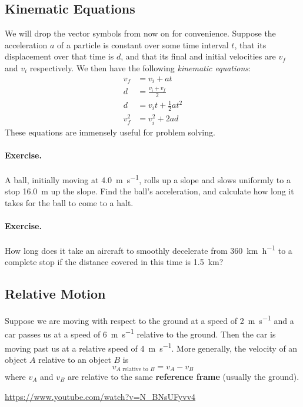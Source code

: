 \documentclass[a4paper]{amsbook}
\begin{document}
\subsection{Kinematic Equations}
We will drop the vector symbols from now on for convenience. Suppose the acceleration $ a $ of a particle is
constant over some time interval $ t $, that its displacement over that time is $ d $, and that its final and
initial velocities are $ v_f $ and $ v_i $ respectively. We then have the following \textit{kinematic equations}:
\begin{align}
  v_f &= v_i + at\\
  d &= \frac{v_i + v_f}{2}\\
  d &= v_i t + \frac{1}{2} at^2\\
  v_f^2 &= v_i^2 + 2ad
\end{align}
These equations are immensely useful for problem solving.
\paragraph{Exercise.} A ball, initially moving at \SI{4.0}{\metre\per\second}, rolls up a slope and slows uniformly
to a stop \SI{16.0}{\metre} up the slope. Find the ball's acceleration, and calculate how long it takes for the ball
to come to a halt.

\paragraph{Exercise.} How long does it take an aircraft to smoothly decelerate from \SI{360}{\kilo\metre\per\hour} to
a complete stop if the distance covered in this time is \SI{1.5}{\kilo\metre}?

\subsection{Relative Motion}
Suppose we are moving with respect to the ground at a speed of \SI{2}{\metre\per\second} and a car passes us at a
speed of \SI{6}{\metre\per\second} relative to the ground. Then the car is moving past us at a relative speed of \SI{4}{\metre\per\second}.
More generally, the velocity of an object $ A $ relative to an object $ B $ is
\begin{equation}
  v_{A \text{ relative to } B} = v_A - v_B
\end{equation}
where $ v_A $ and $ v_B $ are relative to the same \textbf{reference frame} (usually the ground).

\begin{center}
\begin{tcolorbox}[width=0.8\textwidth,colback={red},title={\textbf{Go and watch...}},colbacktitle=yellow,coltitle=blue]
  \textcolor{white}{\url{https://www.youtube.com/watch?v=N_BNsUFyvv4}}
\end{tcolorbox}
\end{center}
\end{document}
